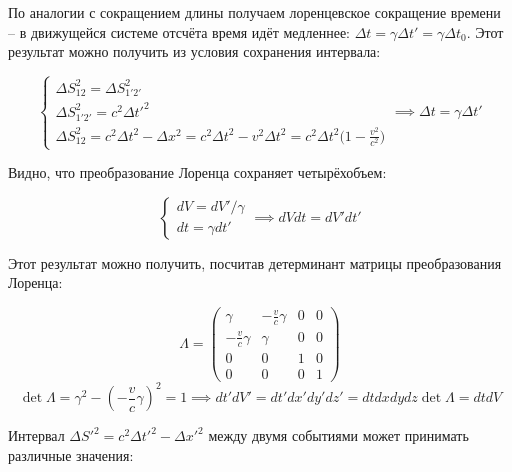 \documentclass{article}
\begin{document}
По аналогии с сокращением длины получаем лоренцевское сокращение времени -- в движущейся системе отсчёта время идёт медленнее: $\Delta t=\gamma\Delta t'=\gamma\Delta t_0$. Этот результат можно получить из условия сохранения интервала:

\begin{equation*}
    \begin{cases}
    \Delta S_{12}^2=\Delta S_{1'2'}^2\\
    \Delta S_{1'2'}^2=c^2\Delta t'^2\\
    \Delta S_{12}^2=c^2\Delta t^2-\Delta x^2=c^2\Delta t^2-v^2\Delta t^2=c^2\Delta t^2\big(1-\frac{v^2}{c^2}\big)
    \end{cases}
    \implies \Delta t=\gamma\Delta t'
\end{equation*}

Видно, что преобразование Лоренца сохраняет четырёхобъем:

\begin{equation*}
    \begin{cases}
    dV=dV'/\gamma\\
    dt=\gamma dt'
    \end{cases}
    \implies dVdt=dV'dt'
\end{equation*}

Этот результат можно получить, посчитав детерминант матрицы преобразования Лоренца:

\begin{equation*}
    \Lambda =
    \begin{pmatrix}
        \gamma & -\frac{v}{c}\gamma & 0 & 0 \\
        -\frac{v}{c}\gamma & \gamma & 0 & 0 \\
        0 & 0 & 1 & 0 \\
        0 & 0 & 0 & 1
    \end{pmatrix}
\end{equation*}
\begin{equation*}
    \det \Lambda = \gamma^2-\left(-\frac{v}{c}\gamma\right)^2=1
    \implies dt'dV'=dt'dx'dy'dz'=dtdxdydz\det\Lambda=dtdV
\end{equation*}

Интервал $\Delta S'^2=c^2\Delta t'^2-\Delta x'^2$ между двумя событиями может принимать различные значения:
\end{document}
